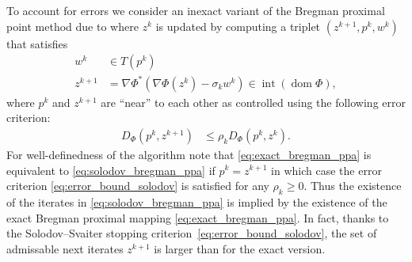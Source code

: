 \documentclass[11pt,onecolumn]{article}
\DeclareMathOperator{\dom}{dom}
\DeclareMathOperator{\intr}{int}
\theoremstyle{remark}
\begin{document}
To account for errors we consider an inexact variant of the Bregman proximal point method due to \cite{solodov2000inexact} where $z^k$ is updated by computing a triplet $(z^{k+1}, p^k, w^k)$ that satisfies
\begin{subequations} \label{eq:solodov_bregman_ppa}
\begin{align}
w^{k} &\in T(p^{k}) \label{eq:solodov_1}\\
z^{k+1} &= \nabla \Phi^*(\nabla \Phi(z^k) - \sigma_k w^{k}) \in \intr (\dom \Phi), \label{eq:extra_gradient}
\end{align}
\end{subequations}
where $p^k$ and $z^{k+1}$ are ``near'' to each other as controlled using the following error criterion:
\begin{align}\label{eq:error_bound_solodov}
D_\Phi(p^{k}, z^{k+1}) &\leq \rho_k D_\Phi(p^{k}, z^k).
\end{align}
For well-definedness of the algorithm note that \cref{eq:exact_bregman_ppa} is equivalent to \cref{eq:solodov_bregman_ppa} if $p^k = z^{k+1}$ in which case the error criterion \cref{eq:error_bound_solodov} is satisfied for any $\rho_k\geq 0$.
Thus the existence of the iterates in \cref{eq:solodov_bregman_ppa} is implied by the existence of the exact Bregman proximal mapping \cref{eq:exact_bregman_ppa}. In fact, thanks to the Solodov--Svaiter stopping criterion~\cref{eq:error_bound_solodov}, the set of admissable next iterates $z^{k+1}$ is larger than for the exact version.
\end{document}
